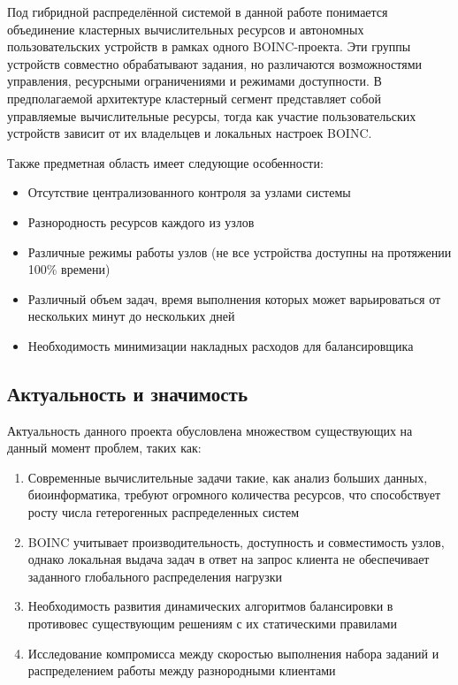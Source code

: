 \documentclass[a4paper,12pt]{extarticle}
\begin{document}
Под гибридной распределённой системой в данной работе понимается объединение кластерных вычислительных ресурсов и автономных пользовательских устройств в рамках одного BOINC-проекта. Эти группы устройств совместно обрабатывают задания, но различаются возможностями управления, ресурсными ограничениями и режимами доступности. В предполагаемой архитектуре кластерный сегмент представляет собой управляемые вычислительные ресурсы, тогда как участие пользовательских устройств зависит от их владельцев и локальных настроек BOINC.

Также предметная область имеет следующие особенности:
\begin{itemize}
    \item Отсутствие централизованного контроля за узлами системы
    \item Разнородность ресурсов каждого из узлов
    \item Различные режимы работы узлов (не все устройства доступны на протяжении 100\% времени)
    \item Различный объем задач, время выполнения которых может варьироваться от нескольких минут до нескольких дней
    \item Необходимость минимизации накладных расходов для балансировщика
\end{itemize}

\subsection{Актуальность и значимость}
Актуальность данного проекта обусловлена множеством существующих на данный момент проблем, таких как:
\begin{enumerate}
    \item Современные вычислительные задачи такие, как анализ больших данных, биоинформатика, требуют огромного количества ресурсов, что способствует росту числа гетерогенных распределенных систем
    \item BOINC учитывает производительность, доступность и совместимость узлов, однако локальная выдача задач в ответ на запрос клиента не обеспечивает заданного глобального распределения нагрузки
    \item Необходимость развития динамических алгоритмов балансировки в противовес существующим решениям с их статическими правилами
    \item Исследование компромисса между скоростью выполнения набора заданий и распределением работы между разнородными клиентами
\end{enumerate}
\end{document}
